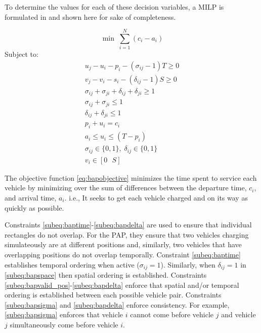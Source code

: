 \documentclass[letterpaper, 10pt, conference]{IEEEtran}
\begin{document}
To determine the values for each of these decision variables, a MILP is formulated in \cite{Qarebagh2019} and shown here
for sake of completeness.

\begin{equation}
	\label{eq:bapobjective}
	\min\; \sum_{i=1}^N (c_i - a_i)
\end{equation}
Subject to:
\begin{subequations}
\label{eq:bapconstrs}
\begin{align}
    u_j - u_i - p_i - (\sigma_{ij} - 1)T \geq 0                   \label{subeq:baptime}         \\
    v_j - v_i - s_i - (\delta_{ij} - 1)S \geq 0                   \label{subeq:bapspace}        \\
    \sigma_{ij} + \sigma_{ji} + \delta_{ij} + \delta_{ji} \geq 1  \label{subeq:bapvalid_pos}    \\
    \sigma_{ij} + \sigma_{ji} \leq 1                              \label{subeq:bapsigma}        \\
    \delta_{ij} + \delta_{ji} \leq 1                              \label{subeq:bapdelta}        \\
    p_i + u_i = c_i                                               \label{subeq:bapdetach}       \\
    a_i \leq u_i \leq (T - p_i)                                   \label{subeq:bapvalid_starts} \\
    \sigma_{ij} \in \{0,1\},\;\delta_{ij} \in \{0,1\}\;           \label{subeq:bapsdspace}      \\
    v_i \in [0 \mbox{ } S ]                                       \label{subeq:bapvspace}
\end{align}
\end{subequations}

\noindent




The objective function \eqref{eq:bapobjective} minimizes the time spent to service each vehicle by minimizing over the
sum of differences between the departure time, $c_i$, and arrival time, $a_i$. i.e., It seeks to get each vehicle
charged and on its way as quickly as possible.

Constraints \ref{subeq:baptime}-\ref{subeq:bapdelta} are used to ensure that individual rectangles do not overlap. For
the PAP, they ensure that two vehicles charging simulateously are at different positions and, similarly, two vehicles
that have overlapping positions do not overlap temporally. Constraint \eqref{subeq:baptime} establishes temporal
ordering when active ($\sigma_{ij}=1$). Similarly, when $\delta_{ij} =1$ in \eqref{subeq:bapspace} then spatial ordering is
established. Constraints \ref{subeq:bapvalid_pos}-\ref{subeq:bapdelta} enforce that spatial and/or temporal ordering is
established between each possible vehicle pair. Constraints \eqref{subeq:bapsigma} and \eqref{subeq:bapdelta} enforce
consistency. For example, \eqref{subeq:bapsigma} enforces that vehicle $i$ cannot come before vehicle $j$ and vehicle
$j$ simultaneously come before vehicle $i$.
\end{document}

